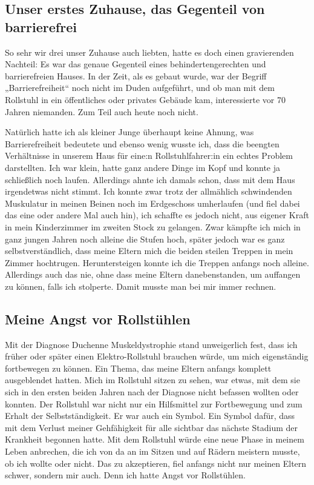 \documentclass[fontsize=14pt,a4paper,headinclude,DIV=calc,automark]{scrbook}
\begin{document}
\subsection{Unser erstes Zuhause, das Gegenteil von barrierefrei}

So sehr wir drei unser Zuhause auch liebten, hatte es doch einen gravierenden Nachteil: Es war das genaue Gegenteil eines behindertengerechten und barrierefreien Hauses. In der Zeit, als es gebaut wurde, war der Begriff „Barrierefreiheit“ noch nicht im Duden aufgeführt, und ob man mit dem Rollstuhl in ein öffentliches oder privates Gebäude kam, interessierte vor 70 Jahren niemanden. Zum Teil auch heute noch nicht.

Natürlich hatte ich als kleiner Junge überhaupt keine Ahnung, was Barrierefreiheit bedeutete und ebenso wenig wusste ich, dass die beengten Verhältnisse in unserem Haus für eine:n Rollstuhlfahrer:in ein echtes Problem darstellten. Ich war klein, hatte ganz andere Dinge im Kopf und konnte ja schließlich noch laufen. Allerdings ahnte ich damals schon, dass mit dem Haus irgendetwas nicht stimmt. Ich konnte zwar trotz der allmählich schwindenden Muskulatur in meinen Beinen noch im Erdgeschoss umherlaufen (und fiel dabei das eine oder andere Mal auch hin), ich schaffte es jedoch nicht, aus eigener Kraft in mein Kinderzimmer im zweiten Stock zu gelangen. Zwar kämpfte ich mich in ganz jungen Jahren noch alleine die Stufen hoch, später jedoch war es ganz selbstverständlich, dass meine Eltern mich die beiden steilen Treppen in mein Zimmer hochtrugen. Heruntersteigen konnte ich die Treppen anfangs noch alleine. Allerdings auch das nie, ohne dass meine Eltern danebenstanden, um auffangen zu können, falls ich stolperte. Damit musste man bei mir immer rechnen.

\subsection{Meine Angst vor Rollstühlen}

Mit der Diagnose Duchenne Muskeldystrophie stand unweigerlich fest, dass ich früher oder später einen Elektro-Rollstuhl brauchen würde, um mich eigenständig fortbewegen zu können. Ein Thema, das meine Eltern anfangs komplett ausgeblendet hatten. Mich im Rollstuhl sitzen zu sehen, war etwas, mit dem sie sich in den ersten beiden Jahren nach der Diagnose nicht befassen wollten oder konnten. Der Rollstuhl war nicht nur ein Hilfsmittel zur Fortbewegung und zum Erhalt der Selbstständigkeit. Er war auch ein Symbol. Ein Symbol dafür, dass mit dem Verlust meiner Gehfähigkeit für alle sichtbar das nächste Stadium der Krankheit begonnen hatte. Mit dem Rollstuhl würde eine neue Phase in meinem Leben anbrechen, die ich von da an im Sitzen und auf Rädern meistern musste, ob ich wollte oder nicht. Das zu akzeptieren, fiel anfangs nicht nur meinen Eltern schwer, sondern mir auch. Denn ich hatte Angst vor Rollstühlen.
\end{document}
